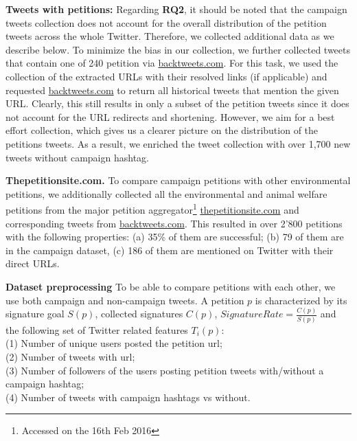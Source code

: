 \textbf{Tweets with petitions:}
Regarding \textbf{RQ2},
it should be noted that the campaign tweets collection does not account for the overall distribution of the petition tweets across the whole Twitter. 
Therefore, we collected additional data as we describe below.
To minimize the bias in our collection, we further collected tweets that contain one of 240 petition via \url{backtweets.com}. For this task, we used the collection of the extracted URLs with their resolved links (if applicable) and requested \url{backtweets.com} to return all historical tweets that mention the given URL.
Clearly, this still results in only a subset of the petition tweets since it does not account for the URL redirects and shortening. However, we aim for a best effort collection, which gives us a clearer picture on the distribution of the petitions tweets.
As a result, we enriched the tweet collection with over 1,700 new tweets without campaign hashtag.

\textbf{Thepetitionsite.com.} To compare campaign petitions with other environmental petitions, we additionally collected all the environmental and animal welfare petitions from the major petition aggregator\footnote{Accessed on the 16th Feb 2016} \url{thepetitionsite.com} and corresponding tweets from \url{backtweets.com}. This resulted in over 2'800 petitions with the following properties: (a) 35\% of them are successful; (b) 79 of them are in the campaign dataset, (c) 186 of them are mentioned on Twitter with their direct URLs.

\textbf{Dataset preprocessing}
To be able to compare petitions with each other, we use both campaign and non-campaign tweets.
A petition $p$ is characterized by its signature goal $S(p)$, collected signatures $C(p)$, $SignatureRate = \frac{C(p)}{S(p)}$ and the following set of Twitter related features $T_i(p)$:\\
(1) Number of unique users posted the petition url;\\
(2) Number of tweets with url;\\
(3) Number of followers of the users posting petition tweets with/without a campaign hashtag;\\
(4) Number of tweets with campaign hashtags vs without.